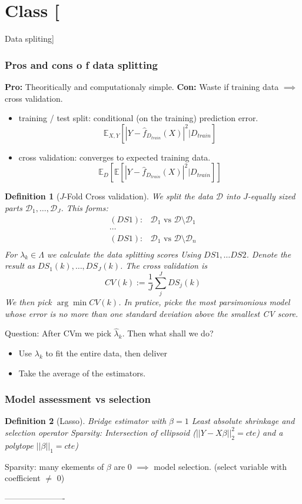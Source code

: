 \documentclass{article}
\newtheorem{definition}{Definition}
\newcommand{\esp}{{\mathbb E}}
\newenvironment{class}[1]
{\section*{Class #1}}
{ ----------------------}
\begin{document}
\begin{class}{2}[Data spliting]

\subsubsection{Pros and cons o f data splitting}
\textbf{Pro:} Theoritically and computationaly simple.
\textbf{Con:} Waste if training data $\implies$ cross validation.

\begin{itemize}
\item training / test split: conditional (on the training) prediction error.
  $$\esp_{X, Y}[ |Y - \hat f_{D_{train}}(X)|^2 | D_{train}]$$
\item cross validation: converges to expected training data.
  $$\esp_D[ \esp[ |Y - \hat f_{D_{train}}(X)|^2 | D_{train}] ]$$
\end{itemize}
\begin{definition}[$J$-Fold Cross validation]
  We split the data $\mathcal D$ into $J$-equally sized parts $\mathcal D_1, \ldots, \mathcal D_J$. This forms:
  \begin{align*}
    (DS1):& \mathcal D_1 \text{ vs } \mathcal D \setminus \mathcal D_1\\
    \cdots\\
    (DS1):& \mathcal D_1 \text{ vs } \mathcal D \setminus \mathcal D_n\\
  \end{align*}
  For $\lambda_k \in \Lambda$ we calculate the data splitting scores Using $DS1, \ldots DS2$. Denote the result as $DS_1(k), \ldots, DS_J(k)$. The cross validation is
  $$CV(k) := \frac1J \sum_j^J DS_j(k)$$
  We then pick $\arg\min CV(k)$.
  In pratice, picke the most parsimonious model whose error is no more than one standard deviation above the smallest CV score.
  
\end{definition}
Question: After CVm we pick $\hat \lambda_k$. Then what shall we do?
\begin{itemize}
\item Use $\lambda_k$ to fit the entire data, then deliver
\item Take the average of the estimators.
\end{itemize}

\subsubsection{Model assessment vs selection}
\begin{definition}[Lasso]
  Bridge estimator with $\beta =1 $
  Least absolute shrinkage and selection operator
  Sparsity: Intersection of ellipsoid ($||Y - X\beta||_2^2 = cte$) and a polytope $||\beta||_1 = cte$)
\end{definition}

Sparsity: many ekements of $\beta$ are 0 $\implies$ model selection. (select variable with coefficient $\ne$ 0)


\end{class}
\end{document}
